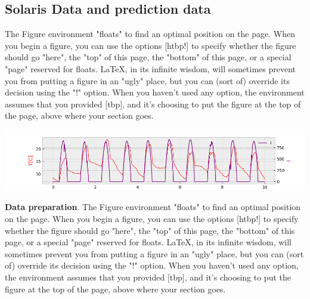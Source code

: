 \subsection{Solaris Data and prediction data}
The Figure environment "floats" to find an optimal position on the page. When you begin a figure, you can use the options [htbp!] to specify whether the figure should go "here", the "top" of this page, the "bottom" of this page, or a special "page" reserved for floats. LaTeX, in its infinite wisdom, will sometimes prevent you from putting a figure in an "ugly" place, but you can (sort of) override its decision using the "!" option. When you haven't used any option, the environment assumes that you provided [tbp], and it's choosing to put the figure at the top of the page, above where your section goes.

\begin{minipage}{\linewidth}
    \begin{center}  
        \includegraphics[width=1.2\linewidth]{images/solaris2}
    \end{center}
\end{minipage}

\textbf{Data preparation}.
The Figure environment "floats" to find an optimal position on the page. When you begin a figure, you can use the options [htbp!] to specify whether the figure should go "here", the "top" of this page, the "bottom" of this page, or a special "page" reserved for floats. LaTeX, in its infinite wisdom, will sometimes prevent you from putting a figure in an "ugly" place, but you can (sort of) override its decision using the "!" option. When you haven't used any option, the environment assumes that you provided [tbp], and it's choosing to put the figure at the top of the page, above where your section goes.

